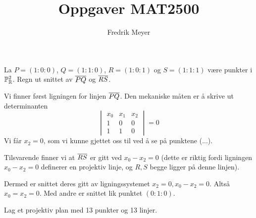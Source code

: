 \documentclass[11pt, norsk]{article}
\begin{document}
\title{Oppgaver MAT2500}
\author{Fredrik Meyer}
\maketitle 

\begin{oppg}
La $P=(1:0:0)$, $Q=(1:1:0)$, $R=(1:0:1)$ og $S=(1:1:1)$ være punkter i $\mathbb{P}^2_{\mathbb{R}}$. Regn ut snittet av $\overline{PQ}$ og $\overline{RS}$.
\end{oppg}
\begin{losn}
Vi finner først ligningen for linjen $\overline{PQ}$. Den mekaniske måten er å skrive ut determinanten
$$
\begin{vmatrix}
 x_0 & x_1 & x_2 \\
 1 & 0 & 0 \\
1 & 1 & 0
\end{vmatrix} = 0
$$
Vi får $x_2=0$, som vi kunne gjettet oss til ved å se på punktene (...).

Tilsvarende finner vi at $\overline{RS}$ er gitt ved $x_0-x_2=0$ (dette er riktig fordi ligningen $x_0-x_2=0$ definerer en projektiv linje, og $R,S$ begge ligger på denne linjen).

Dermed er snittet deres gitt av ligningssystemet $x_2=0, x_0-x_2=0$. Altså $x_0=x_2=0$. Med andre er snittet lik punktet $(0:1:0)$. 
\end{losn}

\begin{oppg}
Lag et projektiv plan med 13 punkter og 13 linjer.
\end{oppg}
\end{document}
